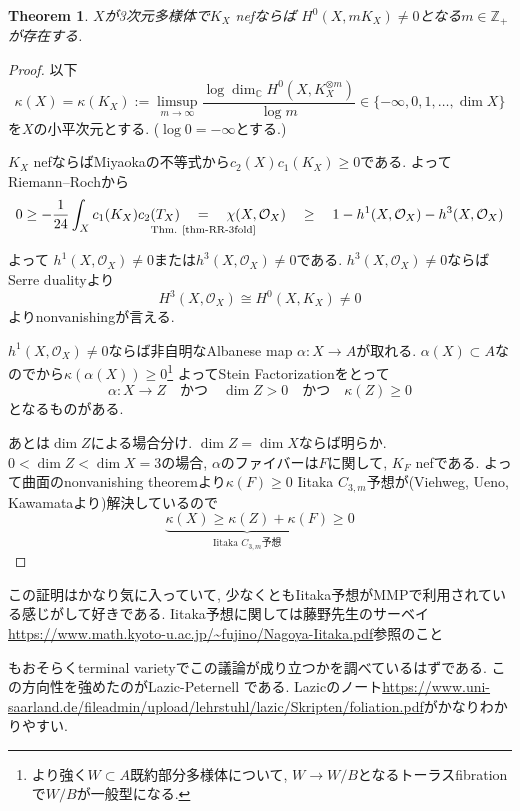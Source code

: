 \documentclass[dvipdfmx,a4paper,11pt]{article} %
\newtheorem{thm}{Theorem}[section]
\theoremstyle{definition}
\theoremstyle{remark}
\numberwithin{equation}{section}
\newcommand{\underalign}[2]{\quad \underset{\mathclap{\strut #1}}{#2}\quad}
\newcommand{\N}{\mathbb{Z}_+}
\newcommand{\C}{\mathbb{C}}
\begin{document}
\begin{thm}\cite{Miy87}\cite{Miy88a}
$X$が3次元多様体で$K_X$ nefならば
$H^0(X, mK_X) \neq 0$となる$m \in \N$が存在する. 
\end{thm}
\begin{proof}
以下
$$
\kappa(X)=\kappa(K_X)
:= \limsup_{ m \to \infty}\frac{\log \dim_\C H^0(X, K_X^{\otimes m})}{\log m} 
\in \{ - \infty, 0, 1, \ldots, \dim X\}
$$
を$X$の小平次元とする. ($\log 0=-\infty$とする.)


$K_X$ nefならばMiyaokaの不等式から$c_2(X)c_1(K_X)\ge 0$である. 
よってRiemann--Rochから
\[
0 \ge 
-\frac{1}{24}\int_X c_1(K_X)c_2(T_X)
\underalign{\text{Thm. \ref{thm-RR-3fold}}}{=}
\chi(X,\mathcal O_X)
\underalign{}{\ge}
1-h^1(X, \mathcal O_X) -h^3(X, \mathcal O_X) 
\]
よって
$h^1(X, \mathcal O_X)\neq0$または$h^3(X, \mathcal O_X)\neq0$である. 
$h^3(X, \mathcal O_X)\neq0$ならばSerre dualityより
$$
H^3(X, \mathcal O_X) \cong H^0(X, K_X) \neq0
$$
よりnonvanishingが言える. 

$h^1(X, \mathcal O_X)\neq0$ならば非自明なAlbanese map
$\alpha : X \to A$が取れる. 
$\alpha(X) \subset A$なので\cite[Theorem 10.9]{Uen75}から$\kappa(\alpha(X))\ge 0$\footnote{より強く$W \subset A$既約部分多様体について, $W \to W/B$となるトーラスfibrationで$W/B$が一般型になる. }
よってStein Factorizationをとって
$$\alpha : X \to Z
\quad \text{かつ} \quad
\dim Z >0\quad \text{かつ} \quad
\kappa(Z) \ge 0
$$となるものがある. 

あとは$\dim Z$による場合分け. 
$\dim Z=\dim X$ならば明らか. 
$0 < \dim Z <  \dim X=3$の場合, $\alpha$のファイバーは$F$に関して, $K_F$ nefである. 
よって曲面のnonvanishing theoremより$\kappa(F)\ge 0$
Iitaka $C_{3, m}$予想が(Viehweg, Ueno, Kawamataより)解決しているので
$$
\underbrace{\kappa(X) \ge \kappa(Z) + \kappa(F)}_{\text{Iitaka $C_{3, m}$予想}}
 \ge 0
$$
\end{proof}
この証明はかなり気に入っていて, 少なくともIitaka予想がMMPで利用されている感じがして好きである. 
Iitaka予想に関しては藤野先生のサーベイ\url{https://www.math.kyoto-u.ac.jp/~fujino/Nagoya-Iitaka.pdf}参照のこと

\cite{Miy88a}もおそらくterminal varietyでこの議論が成り立つかを調べているはずである. 
この方向性を強めたのがLazic-Peternell \cite{LP18}である. 
Lazicのノート\url{https://www.uni-saarland.de/fileadmin/upload/lehrstuhl/lazic/Skripten/foliation.pdf}がかなりわかりやすい. 
\end{document}
